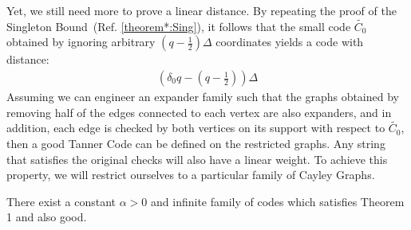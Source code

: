 Yet, we still need more to prove a linear distance. By repeating the proof of the Singleton Bound~(Ref. \ref{theorem*:Sing}), it follows that the small code $\tilde{C_{0}}$ obtained by ignoring arbitrary $(q - \frac{1}{2})\Delta$ coordinates yields a code with distance:
\begin{equation*}
  \begin{split}
    \left( \delta_{0}q - \left( q - \frac{1}{2} \right) \right)\Delta
  \end{split}
\end{equation*}
Assuming we can engineer an expander family such that the graphs obtained by removing half of the edges connected to each vertex are also expanders, and in addition, each edge is checked by both vertices on its support with respect to $\tilde{C_{0}}$, then a good Tanner Code can be defined on the restricted graphs. Any string that satisfies the original checks will also have a linear weight. To achieve this property, we will restrict ourselves to a particular family of Cayley Graphs.
\begin{theorem*}[Theorem 1+] There exist a constant $\alpha > 0 $ and infinite family of codes which satisfies Theorem 1 and also good.
\end{theorem*}


